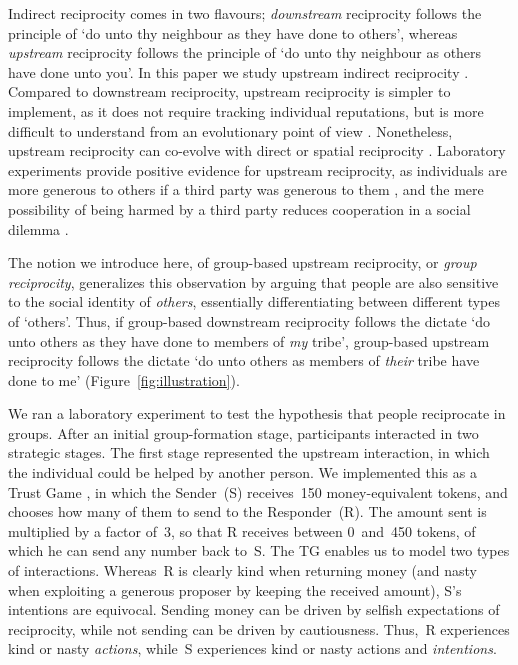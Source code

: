 \documentclass[12pt,a4paper]{article}
\begin{document}



Indirect reciprocity comes in two flavours; \emph{downstream} reciprocity follows the principle of `do unto thy neighbour as they have done to others', whereas \emph{upstream} reciprocity follows the principle of `do unto thy neighbour as others have done unto you'. In this paper we study upstream indirect reciprocity \citep*{nowak2005evolution,nowak2007upstream,boyd1989evolution}. Compared to downstream reciprocity, upstream reciprocity is simpler to implement, as it does not require tracking individual reputations, but is more difficult to understand from an evolutionary point of view \citep*{nowak2005evolution,boyd1989evolution}. Nonetheless, upstream reciprocity can co-evolve with direct or spatial reciprocity \citep*{nowak2007upstream}. Laboratory experiments provide positive evidence for upstream reciprocity, as individuals are more generous to others if a third party was generous to them \citep*{dufwenberg2001direct,guth2001trust,greiner2005indirect}, and the mere possibility of being harmed by a third party reduces cooperation in a social dilemma \citep*{weisel2016social}.


The notion we introduce here, of group-based upstream reciprocity, or \emph{group reciprocity}, generalizes this observation by arguing that people are also sensitive to the social identity of \emph{others}, essentially differentiating between different types of `others'. Thus, if group-based downstream reciprocity \citep*{bernhard2006group,bernhard2006parochial} follows the dictate `do unto others as they have done to members of \emph{my} tribe', group-based upstream reciprocity follows the dictate `do unto others as members of \emph{their} tribe have done to me' (Figure~\ref{fig:illustration}).

We ran a laboratory experiment to test the hypothesis that people reciprocate in groups. After an initial group-formation stage, participants interacted in two strategic stages. The first stage represented the upstream interaction, in which the individual could be helped by another person. We implemented this as a Trust Game \citep*[TG,][]{berg1995trust}, in which the Sender~(S) receives~150 money-equivalent tokens, and chooses how many of them to send to the Responder~(R). The amount sent is multiplied by a factor of~3, so that R receives between 0~and~450 tokens, of which he can send any number back to~S. The TG enables us to model two types of interactions. Whereas~R is clearly kind when returning money (and nasty when exploiting a generous proposer by keeping the received amount), S's intentions are equivocal. Sending money can be driven by selfish expectations of reciprocity, while not sending can be driven by cautiousness. Thus,~R experiences kind or nasty \emph{actions}, while~S experiences kind or nasty actions and \emph{intentions}.
\end{document}
